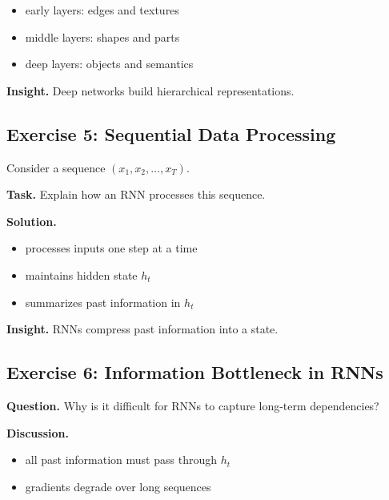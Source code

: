 \begin{itemize}
    \item early layers: edges and textures
    \item middle layers: shapes and parts
    \item deep layers: objects and semantics
\end{itemize}

\medskip

\noindent
\textbf{Insight.}  
Deep networks build hierarchical representations.

\subsection{Exercise 5: Sequential Data Processing}

Consider a sequence $(x_1, x_2, \dots, x_T)$.

\medskip

\noindent
\textbf{Task.}  
Explain how an RNN processes this sequence.

\medskip

\noindent
\textbf{Solution.}

\begin{itemize}
    \item processes inputs one step at a time
    \item maintains hidden state $h_t$
    \item summarizes past information in $h_t$
\end{itemize}

\medskip

\noindent
\textbf{Insight.}  
RNNs compress past information into a state.

\subsection{Exercise 6: Information Bottleneck in RNNs}

\textbf{Question.}  
Why is it difficult for RNNs to capture long-term dependencies?

\medskip

\noindent
\textbf{Discussion.}

\begin{itemize}
    \item all past information must pass through $h_t$
    \item gradients degrade over long sequences
\end{itemize}

